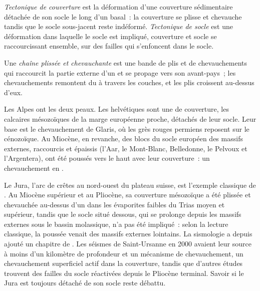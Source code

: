 \begin{definition}\label{def:b2:alpine-orogen:skin}
\emph{Tectonique de couverture} est la déformation d'une
couverture sédimentaire détachée de son socle le long d'un  basal~: la couverture se plisse et
chevauche tandis que le socle sous-jacent reste indéformé. \emph{Tectonique
de socle} est une déformation dans laquelle le socle est impliqué,
couverture et socle se raccourcissant ensemble, sur des failles qui s'enfoncent dans le socle.
\end{definition}

\begin{definition}\label{def:b2:alpine-orogen:ftb}
Une \emph{chaîne plissée et chevauchante} est une bande de plis et
de chevauchements qui raccourcit la partie externe d'un  et se propage vers son avant-pays~; les
chevauchements remontent du  à travers les couches, et les plis croissent au-dessus d'eux.
\end{definition}

Les Alpes ont les deux peaux. Les  helvétiques sont une  de couverture, les
calcaires mésozoïques de la marge européenne proche, détachés de leur socle. Leur base est le
chevauchement de Glaris, où les grès rouges permiens reposent sur le  cénozoïque. Au Miocène, en
revanche, des blocs du socle européen des massifs externes, raccourcis et épaissis (l'Aar, le
Mont-Blanc, Belledonne, le Pelvoux et l'Argentera), ont été poussés vers le haut avec leur
couverture~: un chevauchement en .

Le Jura, l'arc de crêtes au nord-ouest du plateau suisse, est l'exemple classique de . Au Miocène supérieur et au Pliocène, sa couverture mésozoïque a été plissée et chevauchée au-dessus d'un
 dans les évaporites faibles du Trias moyen et supérieur, tandis que le socle situé dessous,
qui se prolonge depuis les massifs externes sous le bassin molassique, n'a pas été impliqué~: selon la lecture
classique, la poussée venait des massifs externes lointains. La sismologie a depuis ajouté un chapitre de
. Les séismes de Saint-Ursanne en 2000 avaient leur source à moins d'un kilomètre
de profondeur et un mécanisme de chevauchement, un chevauchement superficiel actif dans la couverture,
tandis que d'autres études trouvent des failles du socle réactivées depuis le Pliocène terminal. Savoir si
le Jura est toujours détaché de son socle reste débattu.

